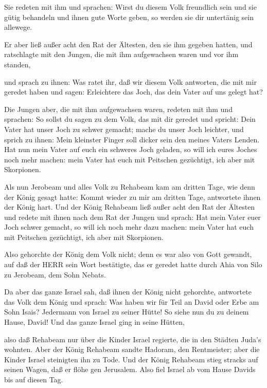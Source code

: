  Sie redeten mit ihm und sprachen: Wirst du diesem Volk
freundlich sein und sie gütig behandeln und ihnen gute Worte geben, so
werden sie dir untertänig sein allewege.

 Er aber ließ außer acht den Rat der Ältesten, den sie ihm
gegeben hatten, und ratschlagte mit den Jungen, die mit ihm aufgewachsen
waren und vor ihm standen,

 und sprach zu ihnen: Was ratet ihr, daß wir diesem Volk
antworten, die mit mir geredet haben und sagen: Erleichtere das Joch,
das dein Vater auf uns gelegt hat?

 Die Jungen aber, die mit ihm aufgewachsen waren, redeten
mit ihm und sprachen: So sollst du sagen zu dem Volk, das mit dir
geredet und spricht: Dein Vater hat unser Joch zu schwer gemacht; mache
du unser Joch leichter, und sprich zu ihnen: Mein kleinster Finger soll
dicker sein den meines Vaters Lenden.  Hat nun mein Vater
auf euch ein schweres Joch geladen, so will ich eures Joches noch mehr
machen: mein Vater hat euch mit Peitschen gezüchtigt, ich aber mit
Skorpionen.

 Als nun Jerobeam und alles Volk zu Rehabeam kam am dritten
Tage, wie denn der König gesagt hatte: Kommt wieder zu mir am dritten
Tage,  antwortete ihnen der König hart. Und der König
Rehabeam ließ außer acht den Rat der Ältesten  und redete
mit ihnen nach dem Rat der Jungen und sprach: Hat mein Vater euer Joch
schwer gemacht, so will ich noch mehr dazu machen: mein Vater hat euch
mit Peitschen gezüchtigt, ich aber mit Skorpionen.

 Also gehorchte der König dem Volk nicht; denn es war also
von Gott gewandt, auf daß der HERR sein Wort bestätigte, das er geredet
hatte durch Ahia von Silo zu Jerobeam, dem Sohn Nebats.

 Da aber das ganze Israel sah, daß ihnen der König nicht
gehorchte, antwortete das Volk dem König und sprach: Was haben wir für
Teil an David oder Erbe am Sohn Isais? Jedermann von Israel zu seiner
Hütte! So siehe nun du zu deinem Hause, David! Und das ganze Israel ging
in seine Hütten,

 also daß Rehabeam nur über die Kinder Israel regierte, die
in den Städten Juda's wohnten.  Aber der König Rehabeam
sandte Hadoram, den Rentmeister; aber die Kinder Israel steinigten ihn
zu Tode. Und der König Rehabeam stieg stracks auf seinen Wagen, daß er
flöhe gen Jerusalem.  Also fiel Israel ab vom Hause Davids
bis auf diesen Tag.


